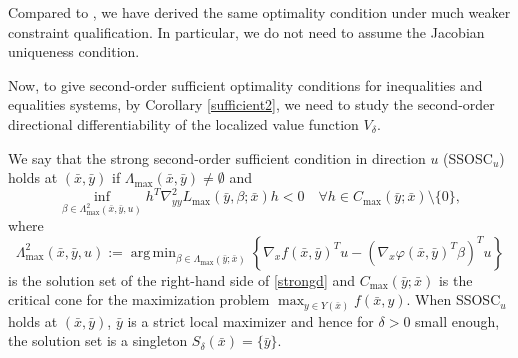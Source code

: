 \documentclass[11pt]{article}
\DeclareMathOperator*{\argmin}{arg\,min}
\numberwithin{equation}{section}
\begin{document}
{{ Compared to \cite[Theorems 3.1 and 3.3]{DaiZh-2020}, we have derived the same optimality condition under much weaker constraint qualification. } In particular, we do not need to assume the Jacobian uniqueness condition.

Now, to give second-order sufficient optimality conditions for inequalities and equalities systems, by  Corollary \ref{sufficient2}, we need to study the second-order directional differentiability of the localized value function $V_\delta$.


We say that the strong second-order sufficient condition in direction $u$ (SSOSC$_u$) holds at $(\bar x,\bar y)$ if $\Lambda_{\max}(\bar x,\bar y) \neq \emptyset$ and
$$\inf_{\beta \in \Lambda^2_{\operatorname{max}}(\bar x,\bar y,u)} h^T \nabla^2_{yy} L_{\max}(\bar y,\beta;\bar x)h <0 \quad \forall h \in C_{\max}(\bar y;\bar x) \setminus \{0\},$$
where 
$$\Lambda^2_{\operatorname{\max}}(\bar x,\bar y,u):=\argmin_{\beta \in \Lambda_{\max} (\bar y;\bar x)} \left \{ \nabla_x f(\bar x,\bar y)^T u-(\nabla_x \varphi (\bar x,\bar y)^T \beta)^T u\right \}$$ is the solution set of the right-hand side of \eqref{strongd} and
$C_{\max}(\bar y;\bar x)$ is the critical cone for the maximization problem $\max_{y\in Y(\bar x)} f(\bar x,y)$.
When SSOSC$_u$  holds at $(\bar x, \bar y)$, $\bar y$ is a strict local maximizer and hence for $\delta>0$ small enough, the solution set is a singleton $S_\delta(\bar x)=\{\bar y\}$.

}
\end{document}
